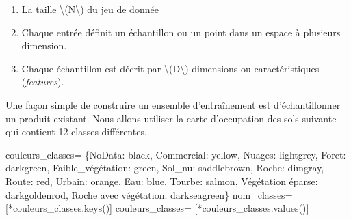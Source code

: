 \documentclass[
]{article}
\newenvironment{Shaded}{}{}
\newcommand{\NormalTok}[1]{#1}
\newcommand{\OperatorTok}[1]{\textcolor[rgb]{0.40,0.40,0.40}{#1}}
\newcommand{\StringTok}[1]{\textcolor[rgb]{0.25,0.44,0.63}{#1}}
\begin{document}
\begin{enumerate}
\def\labelenumi{\arabic{enumi}.}
\item
  La taille {\textbackslash(N\textbackslash)} du jeu de donnée
\item
  Chaque entrée définit un échantillon ou un point dans un espace à
  plusieurs dimension.
\item
  Chaque échantillon est décrit par {\textbackslash(D\textbackslash)}
  dimensions ou caractéristiques (\emph{features}).
\end{enumerate}

Une façon simple de construire un ensemble d'entraînement est
d'échantillonner un produit existant. Nous allons utiliser la carte
d'occupation des sols suivante qui contient 12 classes différentes.

\label{f4e57ed2}
\label{cb5}
\begin{Shaded}
\begin{Highlighting}[]
\NormalTok{couleurs\_classes}\OperatorTok{=}\NormalTok{ \{}\StringTok{\textquotesingle{}NoData\textquotesingle{}}\NormalTok{: }\StringTok{\textquotesingle{}black\textquotesingle{}}\NormalTok{, }\StringTok{\textquotesingle{}Commercial\textquotesingle{}}\NormalTok{: }\StringTok{\textquotesingle{}yellow\textquotesingle{}}\NormalTok{, }\StringTok{\textquotesingle{}Nuages\textquotesingle{}}\NormalTok{: }\StringTok{\textquotesingle{}lightgrey\textquotesingle{}}\NormalTok{, }
                    \StringTok{\textquotesingle{}Foret\textquotesingle{}}\NormalTok{: }\StringTok{\textquotesingle{}darkgreen\textquotesingle{}}\NormalTok{, }\StringTok{\textquotesingle{}Faible\_végétation\textquotesingle{}}\NormalTok{: }\StringTok{\textquotesingle{}green\textquotesingle{}}\NormalTok{, }\StringTok{\textquotesingle{}Sol\_nu\textquotesingle{}}\NormalTok{: }\StringTok{\textquotesingle{}saddlebrown\textquotesingle{}}\NormalTok{,}
                  \StringTok{\textquotesingle{}Roche\textquotesingle{}}\NormalTok{: }\StringTok{\textquotesingle{}dimgray\textquotesingle{}}\NormalTok{, }\StringTok{\textquotesingle{}Route\textquotesingle{}}\NormalTok{: }\StringTok{\textquotesingle{}red\textquotesingle{}}\NormalTok{, }\StringTok{\textquotesingle{}Urbain\textquotesingle{}}\NormalTok{: }\StringTok{\textquotesingle{}orange\textquotesingle{}}\NormalTok{, }\StringTok{\textquotesingle{}Eau\textquotesingle{}}\NormalTok{: }\StringTok{\textquotesingle{}blue\textquotesingle{}}\NormalTok{, }\StringTok{\textquotesingle{}Tourbe\textquotesingle{}}\NormalTok{: }\StringTok{\textquotesingle{}salmon\textquotesingle{}}\NormalTok{, }\StringTok{\textquotesingle{}Végétation éparse\textquotesingle{}}\NormalTok{: }\StringTok{\textquotesingle{}darkgoldenrod\textquotesingle{}}\NormalTok{, }\StringTok{\textquotesingle{}Roche avec végétation\textquotesingle{}}\NormalTok{: }\StringTok{\textquotesingle{}darkseagreen\textquotesingle{}}\NormalTok{\}}
\NormalTok{nom\_classes}\OperatorTok{=}\NormalTok{ [}\OperatorTok{*}\NormalTok{couleurs\_classes.keys()]}
\NormalTok{couleurs\_classes}\OperatorTok{=}\NormalTok{ [}\OperatorTok{*}\NormalTok{couleurs\_classes.values()]}
\end{Highlighting}
\end{Shaded}
\end{document}
